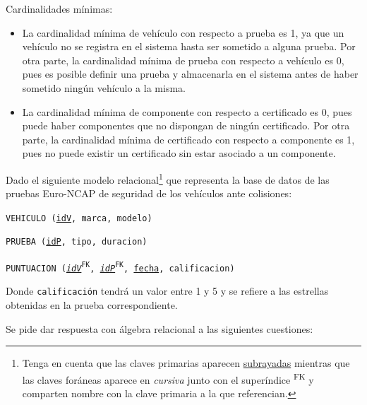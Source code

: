 \documentclass[10pt,a4paper,addpoints,answers]{exam}
\begin{document}
\begin{questions}
\begin{solution}[50em]
Cardinalidades mínimas:
\begin{itemize}
    \item La cardinalidad mínima de vehículo con respecto a prueba es 1, ya que un vehículo no se registra en el sistema hasta ser sometido a alguna prueba. Por otra parte, la cardinalidad mínima de prueba con respecto a vehículo es 0, pues es posible definir una prueba y almacenarla en el sistema antes de haber sometido ningún vehículo a la misma.
    \item La cardinalidad mínima de componente con respecto a certificado es 0, pues puede haber componentes que no dispongan de ningún certificado. Por otra parte, la cardinalidad mínima de certificado con respecto a componente es 1, pues no puede existir un certificado sin estar asociado a un componente.
\end{itemize}
\end{solution}

\newpage
\question[1\half] Dado el siguiente modelo relacional\footnote{Tenga en cuenta que las claves primarias aparecen \underline{subrayadas} mientras que las claves foráneas aparece en \textit{cursiva} junto con el superíndice \textsuperscript{FK} y comparten nombre con la clave primaria a la que referencian.} que representa la base de datos de las pruebas Euro-NCAP de seguridad de los vehículos ante colisiones:

\texttt{VEHICULO (\underline{idV}, marca, modelo)}

\texttt{PRUEBA (\underline{idP}, tipo, duracion)}

\texttt{PUNTUACION (\underline{\textit{idV}}\textsuperscript{FK}, \underline{\textit{idP}}\textsuperscript{FK}, \underline{fecha}, calificacion)} 

Donde \texttt{calificación} tendrá un valor entre 1 y 5 y se refiere a las estrellas obtenidas en la prueba correspondiente.

Se pide dar respuesta con álgebra relacional a las siguientes cuestiones:
\end{questions}
\end{document}
